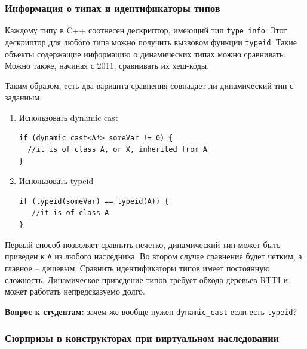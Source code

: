 \documentclass[a4paper,12pt,oneside]{article}
\newif\ifanswers
\begin{document}
\subsubsection{Информация о типах и идентификаторы типов}\label{TypeInfo}

Каждому типу в C++ соотнесен дескриптор, имеющий тип \lstinline!type_info!. Этот дескриптор для любого типа можно получить вызвовом функции \lstinline!typeid!. Такие объекты содержащие информацию о динамических типах можно сравнивать. Можно также, начиная с 2011, сравнивать их хеш-коды.

Таким образом, есть два варианта сравнения совпадает ли динамический тип с заданным.

\begin{enumerate}

\item Использовать dynamic cast

\begin{lstlisting}
if (dynamic_cast<A*> someVar != 0) { 
  //it is of class A, or X, inherited from A 
}
\end{lstlisting}

\item Использовать typeid

\begin{lstlisting}
if (typeid(someVar) == typeid(A)) {
   //it is of class A
}
\end{lstlisting}

\end{enumerate}

Первый способ позволяет сравнить нечетко, динамический тип может быть приведен к \lstinline!A! из любого наследника. Во втором случае сравнение будет четким, а главное -- дешевым. Сравнить идентификаторы типов имеет постоянную сложность. Динамическое приведение типов требует обхода деревьев RTTI и может работать непредсказуемо долго.

\textbf{Вопрос к студентам:} зачем же вообще нужен \lstinline!dynamic_cast! если есть \lstinline!typeid!?

\ifanswers
Правильный ответ: в первую очередь из-за сложностей приведения в связке \lstinline!typeid! + \lstinline!static_cast! (см. выше разговор о том почему в иерархиях множественного наследования нам вообще не хватает статического приведения).
\fi

\subsubsection{Сюрпризы в конструкторах при виртуальном наследовании}\label{VirtualBaseClassConstr}
\end{document}
